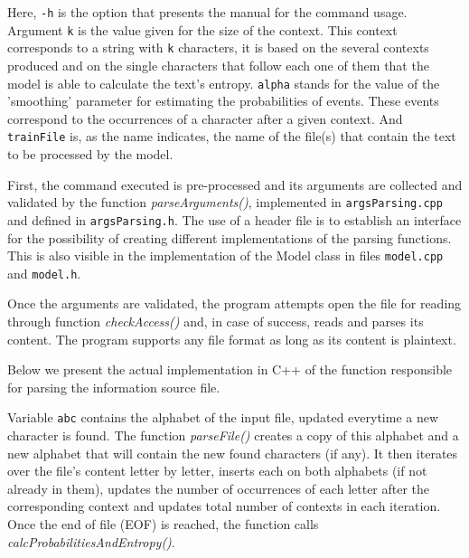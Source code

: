 \documentclass[12pt]{article}
\begin{document}
Here, \texttt{-h} is the option that presents the manual for the command usage.
Argument \texttt{k} is the value given for the size of the context.
This context corresponds to a string with \texttt{k} characters, it is based on
the several contexts produced and on the single characters that follow each one
of them that the model is able to calculate the text's entropy.
\texttt{alpha} stands for the value of the 'smoothing' parameter for estimating
the probabilities of events. 
These events correspond to the occurrences of a character after a given context.
And \texttt{trainFile} is, as the name indicates, the name of the file(s) that
contain the text to be processed by the model.

First, the command executed is pre-processed and its arguments are collected
and validated by the function {\it parseArguments()\/}, implemented in 
\texttt{argsParsing.cpp} and defined in \texttt{argsParsing.h}.
The use of a header file is to establish an interface for the possibility of
creating different implementations of the parsing functions.
This is also visible in the implementation of the Model class in files 
\texttt{model.cpp} and \texttt{model.h}.

Once the arguments are validated, the program attempts open the file for reading
through function {\it checkAccess()\/} and, in case of success, reads and parses
its content.
The program supports any file format as long as its content is plaintext.

\newpage 
Below we present the actual implementation in C++ of the function responsible 
for parsing the information source file.

Variable \texttt{abc} contains the alphabet of the input file, updated everytime
a new character is found.
The function {\it parseFile()\/} creates a copy of this alphabet and a new
alphabet that will contain the new found characters (if any).
It then iterates over the file's content letter by letter, inserts each on both
alphabets (if not already in them), updates the number of occurrences of each 
letter after the corresponding context and updates total number of contexts in 
each iteration.
Once the end of file (EOF) is reached, the function calls 
{\it calcProbabilitiesAndEntropy()\/}.
\end{document}
